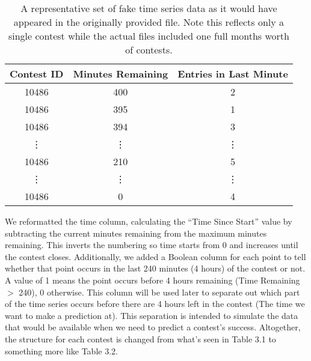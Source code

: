\begin{table}
\begin{center}
\begin{tabular}{| c | c | c |}
\hline
 \textbf{Contest ID} & \textbf{Minutes Remaining} & \textbf{Entries in Last Minute} \\ 
 \hline
 10486 & 400 & 2 \\  
 \hline
 10486 & 395 & 1 \\
 \hline
 10486 & 394 & 3 \\
 \hline
 \vdots & \vdots & \vdots \\
 \hline
 10486 & 210 & 5 \\
 \hline
 \vdots & \vdots & \vdots \\
 \hline
 10486 & 0 & 4 \\
 \hline
\end{tabular}
\caption[Sample Time Series Data as Received]{A representative set of fake time series data as it would have appeared in the originally provided file. Note this reflects only a single contest while the actual files included one full months worth of contests.}
\end{center}
\end{table}

We reformatted the time column, calculating the ``Time Since Start'' value by subtracting the current minutes remaining from the maximum minutes remaining. This inverts the numbering so time starts from 0 and increases until the contest closes. 
Additionally, we added a Boolean column for each point to tell whether that point occurs in the last 240 minutes (4 hours) of the contest or not. A value of 1 means the point occurs before 4 hours remaining (Time Remaining $>$ 240), 0 otherwise. This column will be used later to  separate out which part of the time series occurs before there are 4 hours left in the contest (The time we want to make a prediction at). This separation is intended to simulate the data that would be available when we need to predict a contest's success.
Altogether, the structure for each contest is changed from what's seen in Table 3.1 to something more like Table 3.2.

